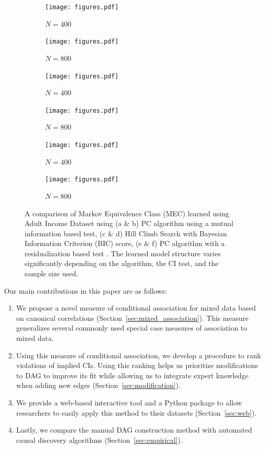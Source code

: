 \documentclass{uai2025} %
\begin{document}
\begin{figure}[t!]
    \begin{subfigure}{0.25 \textwidth}
    	\texttt{[image: figures.pdf]}
    	\caption{$ N = 400 $}
    \end{subfigure}%
    \begin{subfigure}{0.25 \textwidth}
    	\texttt{[image: figures.pdf]}
    	\caption{$ N = 800$ }
    \end{subfigure}
    \begin{subfigure}{0.25 \textwidth}
    	\texttt{[image: figures.pdf]}
    	\caption{$ N = 400 $ }
    \end{subfigure}%
    \begin{subfigure}{0.25\textwidth}
    	\texttt{[image: figures.pdf]}
    	\caption{ $ N = 800$ }
    \end{subfigure}
    \begin{subfigure}{0.25 \textwidth}
    	\texttt{[image: figures.pdf]}
    	\caption{ $ N = 400$ }
    \end{subfigure}%
    \begin{subfigure}{0.25\textwidth}
    	\texttt{[image: figures.pdf]}
    	\caption{$ N = 800$ }
    \end{subfigure}

    \caption{A comparison of Markov Equivalence Class (MEC) learned using Adult
	     Income Dataset \citep{Becker1996} using (a \& b) PC algorithm
	     using a mutual information based test, (c \& d) Hill Climb Search
	     with Bayesian Information Criterion (BIC) score, (e \& f) PC
	     algorithm with a residualization based test \citep{Ankan2023}. The
	     learned model structure varies significantly depending on the
     	     algorithm, the CI test, and the sample size used.}
    \label{fig:intro}
\end{figure}


Our main contributions in this paper are as follows:

\begin{enumerate}
    \item We propose a novel measure of conditional association for mixed data
	    based on canonical correlations
	    (Section~\ref{sec:mixed_association}). This measure generalizes
	    several commonly used special case measures of association to mixed
	    data.
    \item Using this measure of conditional association, we develop a procedure
	    to rank violations of implied CIs. Using this ranking helps us
	    prioritize modifications to DAG to improve its fit while allowing
	    us to integrate expert knowledge when adding new edges (Section~\ref{sec:modification}).
    \item We provide a web-based interactive tool and a Python package to allow 
	    researchers to easily apply this method to their datasets (Section~\ref{sec:web}).
    \item Lastly, we compare the manual DAG construction method with automated
	    causal discovery algorithms (Section~\ref{sec:empirical}).
\end{enumerate}
\end{document}
